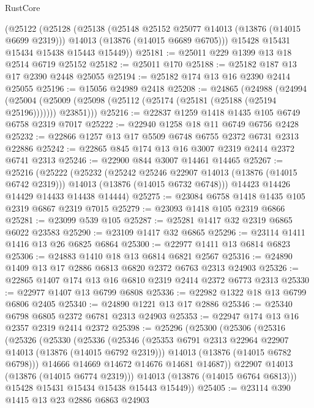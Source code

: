 \begin{lexlean}{RustCore}
\begin{coremodule}
    (@25122
      (@25128
        (@25138
          (@25148 @25152 @25077 @14013 (@13876 (@14015 @6699 @2319)))
          @14013
          (@13876 (@14015 @6689 @6705)))
        @15428
        @15431
        @15434
        @15438
        @15443
        @15449))
@25181 := @25011 @229 @1399 @13 @18 @2514 @6719 @25152
@25182 := @25011 @170
@25188 := @25182 @187 @13 @17 @2390 @2448 @25055
@25194 := @25182 @174 @13 @16 @2390 @2414 @25055
@25196 := @15056 @24989 @2418
@25208 := @24865
    (@24988
      (@24994
        (@25004 (@25009 (@25098 (@25112 (@25174 (@25181 (@25188 (@25194 @25196))))))) @23851)))
@25216 := @22837 @1259 @1418 @1435 @105 @6749 @6758 @2319 @7017
@25222 := @22940 @1258 @18 @11 @6749 @6756 @2428
@25232 := @22866 @1257 @13 @17 @5509 @6748 @6755 @2372 @6731 @2313 @22886
@25242 := @22865 @845 @174 @13 @16 @3007 @2319 @2414 @2372 @6741 @2313
@25246 := @22900 @844 @3007 @14461 @14465
@25267 := @25216
    (@25222
      (@25232
        (@25242 @25246 @22907 @14013 (@13876 (@14015 @6742 @2319)))
        @14013
        (@13876 (@14015 @6732 @6748)))
      @14423
      @14426
      @14429
      @14433
      @14438
      @14444)
@25275 := @23084 @6758 @1418 @1435 @105 @2319 @6867 @2319 @7015
@25279 := @23093 @1418 @105 @2319 @6866
@25281 := @23099 @539 @105
@25287 := @25281 @1417 @32 @2319 @6865 @6022 @23583
@25290 := @23109 @1417 @32 @6865
@25296 := @23114 @1411 @1416 @13 @26 @6825 @6864
@25300 := @22977 @1411 @13 @6814 @6823
@25306 := @24883 @1410 @18 @13 @6814 @6821 @2567
@25316 := @24890 @1409 @13 @17 @2886 @6813 @6820 @2372 @6763 @2313 @24903
@25326 := @22865 @1407 @174 @13 @16 @6810 @2319 @2414 @2372 @6773 @2313
@25330 := @22977 @1407 @13 @6799 @6808
@25336 := @22982 @1322 @18 @13 @6799 @6806 @2405
@25340 := @24890 @1221 @13 @17 @2886
@25346 := @25340 @6798 @6805 @2372 @6781 @2313 @24903
@25353 := @22947 @174 @13 @16 @2357 @2319 @2414 @2372
@25398 := @25296
    (@25300
      (@25306
        (@25316
          (@25326
            (@25330
              (@25336
                (@25346
                  (@25353 @6791 @2313 @22964 @22907 @14013 (@13876 (@14015 @6792 @2319)))
                  @14013
                  (@13876 (@14015 @6782 @6798)))
                @14666
                @14669
                @14672
                @14676
                @14681
                @14687))
            @22907
            @14013
            (@13876 (@14015 @6774 @2319)))
          @14013
          (@13876 (@14015 @6764 @6813)))
        @15428
        @15431
        @15434
        @15438
        @15443
        @15449))
@25405 := @23114 @390 @1415 @13 @23 @2886 @6863 @24903

\end{coremodule}
\end{lexlean}
